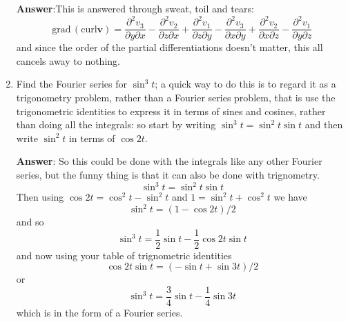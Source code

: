 \documentclass[12pt]{article}
\begin{document}
\begin{enumerate}
\textbf{Answer}:This is answered through sweat, toil and tears:
\begin{equation}
\mbox{grad}\,(\mbox{curl}\mathbf{v})=\frac{\partial^2 v_3}{\partial y\partial x}-\frac{\partial^2 v_2}{\partial z\partial x}+\frac{\partial^2 v_1}{\partial z\partial y}-\frac{\partial^2 v_3}{\partial x\partial y}+\frac{\partial^2 v_2}{\partial x\partial z}-\frac{\partial^2 v_1}{\partial y\partial z}
\end{equation}
and since the order of the partial differentiations doesn't matter,
this all cancels away to nothing.

\item Find the Fourier series for $\sin^3 t$; a quick way to do this is to regard it as a trigonometry problem, rather than a Fourier series problem, that is use the trigonometric identities to express it in terms of sines and cosines, rather than doing all the integrals: so start by writing $\sin^3 t=\sin^2 t \sin t$ and then write $\sin^2 t$ in terms of $\cos 2t$.

\textbf{Answer}: So this could be done with the integrals like any other Fourier series, but the funny thing is that it can also be done with trignometry.
\begin{equation}
\sin^3 t=\sin^2t \sin t
\end{equation}
Then using $\cos{2t}=\cos^2t - \sin^2 t$ and $1=\sin^2t +\cos^2t$ we have
\begin{equation}
\sin^2t = (1-\cos{2t})/2
\end{equation}
and so
\begin{equation}
\sin^3t=\frac{1}{2}\sin{t}-\frac{1}{2}\cos{2t}\sin{t}
\end{equation}
and now using your table of trignometric identities
\begin{equation}
\cos{2t}\sin{t}=(-\sin{t}+\sin{3t})/2
\end{equation}
or
\begin{equation}
\sin^3t=\frac{3}{4}\sin{t}-\frac{1}{4}\sin{3t}
\end{equation}
which is in the form of a Fourier series.






\end{enumerate}
\end{document}
